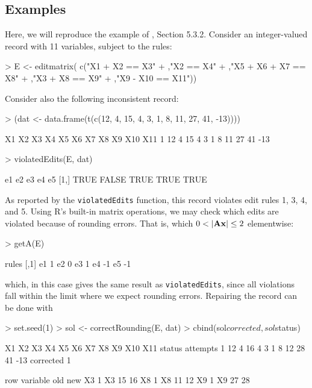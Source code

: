 \documentclass[11pt, fleqn, a4paper]{article}
\begin{document}
\subsection{Examples}
Here, we will reproduce the example of \cite{scholtus:2008}, Section 5.3.2.
Consider an integer-valued record with 11 variables, subject to the rules:
\begin{Schunk}
\begin{Sinput}
> E <- editmatrix( c("X1 + X2 == X3"
+                   ,"X2 == X4"
+                   ,"X5 + X6 + X7 == X8"
+                   ,"X3 + X8 == X9"
+                   ,"X9 - X10 == X11"))
\end{Sinput}
\end{Schunk}
Consider also the following inconsistent record:
\begin{Schunk}
\begin{Sinput}
> (dat <- data.frame(t(c(12, 4, 15, 4, 3, 1, 8, 11, 27, 41, -13))))
\end{Sinput}
\begin{Soutput}
  X1 X2 X3 X4 X5 X6 X7 X8 X9 X10 X11
1 12  4 15  4  3  1  8 11 27  41 -13
\end{Soutput}
\begin{Sinput}
> violatedEdits(E, dat)
\end{Sinput}
\begin{Soutput}
       e1    e2   e3   e4   e5
[1,] TRUE FALSE TRUE TRUE TRUE
\end{Soutput}
\end{Schunk}
As reported by the {\tt violatedEdits} function, this record violates edit rules
1, 3, 4, and 5.  Using R's built-in matrix operations, we may check which edits
are violated because of rounding errors. That is, which $0<|{\bf Ax}|\leq 2$ elementwise:
\begin{Schunk}
\begin{Sinput}
> getA(E) %*% t(as.matrix(dat))
\end{Sinput}
\begin{Soutput}
rules [,1]
   e1    1
   e2    0
   e3    1
   e4   -1
   e5   -1
\end{Soutput}
\end{Schunk}
which, in this case gives the same result as {\tt violatedEdits}, since all
violations fall within the limit where we expect rounding errors.  Repairing
the record can be done with
\begin{Schunk}
\begin{Sinput}
> set.seed(1)
> sol <- correctRounding(E, dat)
> cbind(sol$corrected, sol$status)
\end{Sinput}
\begin{Soutput}
  X1 X2 X3 X4 X5 X6 X7 X8 X9 X10 X11    status attempts
1 12  4 16  4  3  1  8 12 28  41 -13 corrected        1
\end{Soutput}
\begin{Soutput}
   row variable old new
X3   1       X3  15  16
X8   1       X8  11  12
X9   1       X9  27  28
\end{Soutput}
\end{Schunk}
\end{document}
